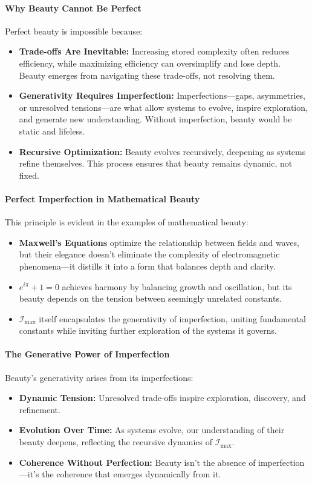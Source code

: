 \documentclass[12pt]{article}
\begin{document}
\paragraph{Why Beauty Cannot Be Perfect}
Perfect beauty is impossible because:
\begin{itemize}
    \item \textbf{Trade-offs Are Inevitable:}  
    Increasing stored complexity often reduces efficiency, while maximizing efficiency can oversimplify and lose depth. Beauty emerges from navigating these trade-offs, not resolving them.
    \item \textbf{Generativity Requires Imperfection:}  
    Imperfections—gaps, asymmetries, or unresolved tensions—are what allow systems to evolve, inspire exploration, and generate new understanding. Without imperfection, beauty would be static and lifeless.
    \item \textbf{Recursive Optimization:}  
    Beauty evolves recursively, deepening as systems refine themselves. This process ensures that beauty remains dynamic, not fixed.
\end{itemize}

\paragraph{Perfect Imperfection in Mathematical Beauty}
This principle is evident in the examples of mathematical beauty:
\begin{itemize}
    \item \textbf{Maxwell’s Equations} optimize the relationship between fields and waves, but their elegance doesn’t eliminate the complexity of electromagnetic phenomena—it distills it into a form that balances depth and clarity.
    \item \textbf{\( e^{i\pi} + 1 = 0 \)} achieves harmony by balancing growth and oscillation, but its beauty depends on the tension between seemingly unrelated constants.
    \item \textbf{\(\mathcal{I}_{\text{max}}\)} itself encapsulates the generativity of imperfection, uniting fundamental constants while inviting further exploration of the systems it governs.
\end{itemize}

\paragraph{The Generative Power of Imperfection}
Beauty’s generativity arises from its imperfections:
\begin{itemize}
    \item \textbf{Dynamic Tension:}  
    Unresolved trade-offs inspire exploration, discovery, and refinement.
    \item \textbf{Evolution Over Time:}  
    As systems evolve, our understanding of their beauty deepens, reflecting the recursive dynamics of \( \mathcal{I}_{\text{max}} \).
    \item \textbf{Coherence Without Perfection:}  
    Beauty isn’t the absence of imperfection—it’s the coherence that emerges dynamically from it.
\end{itemize}
\end{document}
